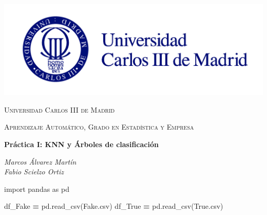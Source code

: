 \documentclass[
  11pt,
  a4paper,
]{article}
\author{}
\date{\vspace{-2.5em}}
\newenvironment{Shaded}{\begin{snugshade}}{\end{snugshade}}
\newcommand{\ImportTok}[1]{#1}
\newcommand{\NormalTok}[1]{#1}
\newcommand{\OperatorTok}[1]{\textcolor[rgb]{0.81,0.36,0.00}{\textbf{#1}}}
\newcommand{\StringTok}[1]{\textcolor[rgb]{0.31,0.60,0.02}{#1}}
\begin{document}

\graphicspath{ {images/} }

\begin{center}
\centering
	\includegraphics[width=1.5\textwidth]{uc3m}\par\vspace{1cm}
{\scshape\LARGE Universidad Carlos III de Madrid \par}
	\vspace{1cm}
	{\scshape\Large Aprendizaje Automático, Grado en Estadística y Empresa \par}
	\vspace{1.5cm}
	{\huge\bfseries Práctica I: KNN y Árboles de clasificación \par}
	\vspace{2cm}
	{\Large\itshape Marcos Álvarez Martín \\ Fabio Scielzo Ortiz \par}
	\date{3 de Marzo de 2022}
	\vfill
	\vfill
\end{center}

\newpage
\tableofcontents
\newpage

\begin{Shaded}
\begin{Highlighting}[]
\ImportTok{import}\NormalTok{ pandas }\ImportTok{as}\NormalTok{ pd}
\end{Highlighting}
\end{Shaded}

\begin{Shaded}
\begin{Highlighting}[]
\NormalTok{df\_Fake }\OperatorTok{=}\NormalTok{ pd.read\_csv(}\StringTok{\textquotesingle{}Fake.csv\textquotesingle{}}\NormalTok{)}
\NormalTok{df\_True }\OperatorTok{=}\NormalTok{ pd.read\_csv(}\StringTok{\textquotesingle{}True.csv\textquotesingle{}}\NormalTok{)}
\end{Highlighting}
\end{Shaded}
\end{document}
